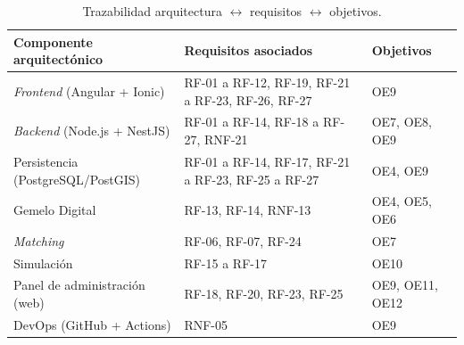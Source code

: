 \begin{table}[H]
  \centering
  \begin{tabularx}{\textwidth}{Y{1.0800} Y{0.9600} Y{0.9600}}
    \hline
    \textbf{Componente arquitectónico} & \textbf{Requisitos asociados} & \textbf{Objetivos} \\
    \hline
    \textit{Frontend} (Angular + Ionic) & RF-01 a RF-12, RF-19, RF-21 a RF-23, RF-26, RF-27 & OE9 \\
    \textit{Backend} (Node.js + NestJS) & RF-01 a RF-14, RF-18 a RF-27, RNF-21 & OE7, OE8, OE9 \\
    Persistencia (PostgreSQL/PostGIS) & RF-01 a RF-14, RF-17, RF-21 a RF-23, RF-25 a RF-27 & OE4, OE9 \\
    Gemelo Digital & RF-13, RF-14, RNF-13 & OE4, OE5, OE6 \\
    \textit{Matching} & RF-06, RF-07, RF-24 & OE7 \\
    Simulación & RF-15 a RF-17 & OE10 \\
    Panel de administración (web) & RF-18, RF-20, RF-23, RF-25 & OE9, OE11, OE12 \\
    DevOps (GitHub + Actions) & RNF-05 & OE9 \\
    \hline
  \end{tabularx}
  \caption{Trazabilidad arquitectura \texorpdfstring{$\leftrightarrow$}{<->} requisitos \texorpdfstring{$\leftrightarrow$}{<->} objetivos.}
  \label{tab:trazabilidad-arq}
\end{table}
